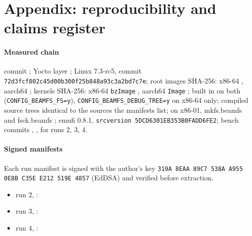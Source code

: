 \section*{Appendix: reproducibility and claims register}
\label{sec:repro}

\paragraph*{Measured chain}
\bfs commit \hash{\commitBeamfsFull}; Yocto layer \texttt{\commitYocto};
Linux 7.3-rc5, commit \texttt{72d3fcf802c45d00b300f25b848a93c3a2bd7c7e};
root images SHA-256: x86-64 \hash{\imageXSha}, aarch64 \hash{\imageSha};
kernels SHA-256: x86-64 \texttt{bzImage} , aarch64
\texttt{Image} ; \bfs built in on both
(\texttt{CONFIG\_BEAMFS\_FS=y}), \texttt{CONFIG\_BEAMFS\_DEBUG\_TREE=y}
on x86-64 only; \srcTrees{} compiled source trees identical to the
sources the manifests list; on x86-01, mkfs.beamfs \hash{\xfsXMkfsSha}
and fsck.beamfs \hash{\xfsXFsckSha}; emufi 0.8.1,
\texttt{srcversion 5DCD6301EB353B0FADD6FE2}; bench commits
\texttt{\commitBenchTwo}, \texttt{\commitBenchThree},
\texttt{\commitBenchFour} for runs 2, 3, 4.

\paragraph*{Signed manifests}
Each run manifest is signed with the author's key
\texttt{319A 8EAA 89C7 538A A955 0E8B C35E E212 519E 4857} (EdDSA) and
verified before extraction.
\begin{itemize}
\item run 2, \texttt{\manifestNameTwo}: \hash{\manifestShaTwo}
\item run 3, \texttt{\manifestNameThree}: \hash{\manifestShaThree}
\item run 4, \texttt{\manifestNameFour}: \hash{\manifestShaFour}
\end{itemize}

